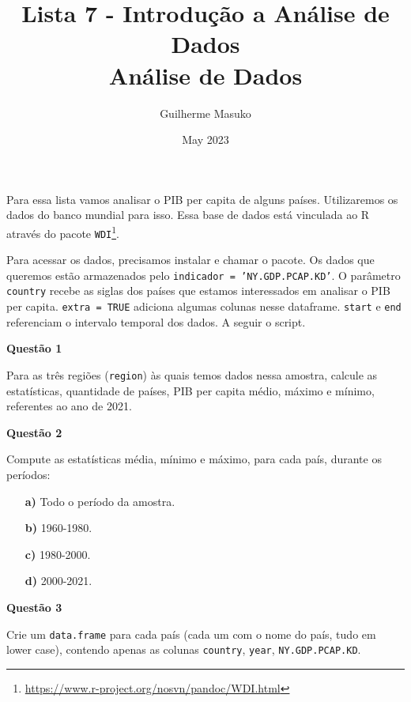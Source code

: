 \documentclass[12pt, a4paper]{article}
\title{Lista 7 - Introdução a Análise de Dados \\
	Análise de Dados}
\author{Guilherme Masuko}
\date{May 2023}
\begin{document}
	
\clearpage
\maketitle
\thispagestyle{empty}

Para essa lista vamos analisar o PIB per capita de alguns países. Utilizaremos os dados do banco mundial para isso. Essa base de dados está vinculada ao R através do pacote \texttt{WDI}\footnote{\url{https://www.r-project.org/nosvn/pandoc/WDI.html}}.

Para acessar os dados, precisamos instalar e chamar o pacote. Os dados que queremos estão armazenados pelo \texttt{indicador = 'NY.GDP.PCAP.KD'}. O parâmetro \texttt{country} recebe as siglas dos países que estamos interessados em analisar o PIB per capita. \texttt{extra = TRUE} adiciona algumas colunas nesse dataframe. \texttt{start} e \texttt{end} referenciam o intervalo temporal dos dados. A seguir o script.





\textbf{Questão 1}

Para as três regiões (\texttt{region}) às quais temos dados nessa amostra, calcule as estatísticas, quantidade de países, PIB per capita médio, máximo e mínimo, referentes ao ano de 2021.



\textbf{Questão 2}

Compute as estatísticas média, mínimo e máximo, para cada país, durante os períodos:

\begin{itemize}
	\item[\textbf{a)}] Todo o período da amostra.
	
	\item[\textbf{b)}] 1960-1980.
	
	\item[\textbf{c)}] 1980-2000.
	
	\item[\textbf{d)}] 2000-2021.
		
\end{itemize}



\textbf{Questão 3}

Crie um \texttt{data.frame} para cada país (cada um com o nome do país, tudo em lower case), contendo apenas as colunas \texttt{country}, \texttt{year}, \texttt{NY.GDP.PCAP.KD}.
\end{document}
